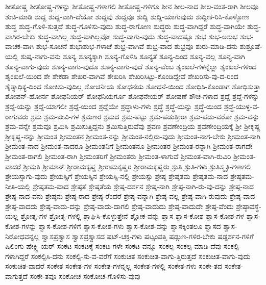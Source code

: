 {ಶೀತೋಷ್ಣ
ಶೀತೋಷ್ಣ-ಗಳನ್ನು
ಶೀತೋಷ್ಣ-ಗಳಾಗಲಿ
ಶೀತೋಷ್ಣ-ಗಳಿಗೂ
ಶೀನ
ಶೀಲ-ನಾದ
ಶೀಲ-ವಂತ-ರಾಗಿ
ಶೀಲವೂ
ಶುಚಿ-ಮಾಡಿ
ಶುದ್ದ
ಶುದ್ದ-ವಾಗಿ-ದೆಯೋ
ಶುದ್ದವು
ಶುದ್ದವೂ
ಶುದ್ದಿ
ಶುದ್ದಿ-ಯಾಗುವುದು
ಶುದ್ದೀಕ-ರಿಸಿ-ಕೊಳ್ಳೋಣ
ಶುದ್ಧ
ಶುದ್ಧ-ಗೊಳಿ-ಸುತ್ತದೆ
ಶುದ್ಧ-ಗೊಳಿಸು-ವುದು
ಶುದ್ಧ-ರಾಗೋಣ
ಶುದ್ಧರು
ಶುದ್ಧ-ವಾಗಿದ್ದರೆ
ಶುದ್ಧ-ವಾಗಿಯೇ
ಶುದ್ಧ-ವಾಗಿರ-ಬೇಕು
ಶುದ್ಧ-ವಾಗಿಲ್ಲ
ಶುದ್ಧ-ವಾಗಿಲ್ಲವೋ
ಶುದ್ಧ-ವಾಗು-ವುದು
ಶುದ್ಧ-ವಾದಷ್ಟೂ
ಶುಭ
ಶುಭ-ಅಶುಭ
ಶುಭ-ವಾಚಕ-ವಾಗಿ
ಶುಭ-ಸೂಚನೆ
ಶುಭಾಶುಭ-ಗಳಾಚೆ
ಶುಭ್ರ-ವಾಗಿವೆ
ಶುಭ್ರ-ವಾದ
ಶುಭ್ರವೂ
ಶುರು-ಮಾಡಿ-ದನು
ಶುಶ್ರೂಷೆ-ಯಲ್ಲಿ
ಶುಷ್ಕ-ನಾಗು-ವನು
ಶೂನ್ಯ
ಶೂನ್ಯಕ್ಕಾಗಿ
ಶೂನ್ಯ-ಗೊಳಿಸಿ
ಶೂನ್ಯತೆ
ಶೂನ್ಯ-ದಿಂದ
ಶೂನ್ಯ-ವಲ್ಲ
ಶೂನ್ಯ-ವಾಗಿ
ಶೂನ್ಯ-ವಾಗು-ವುದು
ಶೂನ್ಯ-ವಾಗು-ವುದೂ
ಶೂನ್ಯ-ವಾಗು-ವುದೆ
ಶೂನ್ಯ-ವೆಂಬ
ಶೃಂಖಲೆ-ಗಳನ್ನೆಲ್ಲಾ
ಶೃಂಖಲೆ-ಗಳಿಂದ
ಶೃಂಖಲೆ-ಯಿಂದ
ಶೇ
ಶೇಕಡಾ
ಶೇಖರ-ವಾಗಿವೆ
ಶೇಖರಿಸಿ
ಶೇಖರಿಸಿಟ್ಟು-ಕೊಂಡಿದ್ದೇವೆ
ಶೇಖರಿಸು-ವು-ದ-ರಿಂದ
ಶೈತ್ಯಾಧಿಕ್ಯ-ದಿಂದ
ಶೋಕಿಸು-ವುದಿಲ್ಲ
ಶೋಚನೀಯ
ಶೋಧನೆಯ
ಶೋಧನೆ-ಯಿಂದ
ಶೋಧಿಸಿ-ಕೊಂಡಾಗ
ಶೋಧಿಸುತ್ತಾ
ಶೋಪನ್-ಹೋರ್ನ
ಶೋಫನಿಯರ್
ಶೋಫನಿಯರ್ಗೂ
ಶೋಫನೇಯರ್
ಶೋಷಣೆ
ಶೌಚ-ಗಳಾದ
ಶ್ರದ್ದೆ
ಶ್ರದ್ದೆ-ಗಳನ್ನು
ಶ್ರದ್ದೆ-ಯನ್ನು
ಶ್ರದ್ದೆ-ಯಾಗಲೀ
ಶ್ರದ್ದೆ-ಯಿಂದ
ಶ್ರದ್ದೆಯೇ
ಶ್ರದ್ಧಾಳು-ಗಳು
ಶ್ರದ್ಧೆ
ಶ್ರದ್ಧೆ-ಯನ್ನು
ಶ್ರದ್ಧೆ-ಯಿಂದ
ಶ್ರದ್ಧೆ-ಯುಳ್ಳ-ವ-ರಾಗುವರು
ಶ್ರಮ
ಶ್ರಮ-ಜೀವಿ-ಗಳ
ಶ್ರಮಣರ
ಶ್ರಮದ
ಶ್ರಮ-ಪಟ್ಟು
ಶ್ರಮ-ಪಡುತ್ತೀರಾ
ಶ್ರಮ-ಪಡು-ವರೋ
ಶ್ರಮ-ವನ್ನು
ಶ್ರಮ-ವನ್ನೇ
ಶ್ರಮವೂ
ಶ್ರಮಿಸಿ
ಶ್ರಮಿಸುತ್ತಿದ್ದನು
ಶ್ರಮಿಸುತ್ತಿರುವೆವು
ಶ್ರವಣ
ಶ್ರವಣೇಂದ್ರಿಯ
ಶ್ರವಣೇಂದ್ರಿಯಕ್ಕೆ
ಶ್ರೀ
ಶ್ರೀಕೃಷ್ಣ
ಶ್ರೀಕೃಷ್ಣ-ನನ್ನು
ಶ್ರೀಮಂತ
ಶ್ರೀಮಂತನ
ಶ್ರೀಮಂತ-ನನ್ನು
ಶ್ರೀಮಂತ-ನಲ್ಲಿರು-ವುದು
ಶ್ರೀಮಂತ-ನಾಗ-ಬೇಕು
ಶ್ರೀಮಂತ-ನಾಗಿ
ಶ್ರೀಮಂತ-ನಾದ
ಶ್ರೀಮಂತ-ನಾದರೂ
ಶ್ರೀಮಂತನಿಗೆ
ಶ್ರೀಮಂತನೂ
ಶ್ರೀಮಂತರ
ಶ್ರೀಮಂತ-ರನ್ನಾಗಿ
ಶ್ರೀಮಂತ-ರಾಗದೇ
ಶ್ರೀಮಂತ-ರಾಗಲಿ
ಶ್ರೀಮಂತ-ರಾಗಿ
ಶ್ರೀಮಂತರಿಗೆ
ಶ್ರೀಮಂತರು
ಶ್ರೀಮಂತ-ಳಾಗುವೆ
ಶ್ರೀಮಂತ-ವಾಗಿ-ರುವಿರಿ
ಶ್ರೀಮಂತ-ವಾದರೆ
ಶ್ರೀಮತಿ
ಶ್ರೀಮಾನ್
ಶ್ರೀರಾಮಕೃಷ್ಣ
ಶ್ರೀರಾಮಕೃಷ್ಣರ
ಶ್ರೀರಾಮಕೃಷ್ಣರು
ಶ್ರುತಿ
ಶ್ರುತಿ-ಗಳು
ಶ್ರುತಿಸ್ಮೃತಿ-ಗಳಾಗಲಿ
ಶ್ರೇಯಸ್ಸಾಗು-ವುದು
ಶ್ರೇಯಸ್ಸಿಗೆ
ಶ್ರೇಯಸ್ಸಿನ
ಶ್ರೇಯಸ್ಸಿ-ನಲ್ಲಿ
ಶ್ರೇಯಸ್ಸು
ಶ್ರೇಷ್ಠ
ಶ್ರೇಷ್ಠತಮ
ಶ್ರೇಷ್ಠತಮ-ನಾದ
ಶ್ರೇಷ್ಠತಮ-ನೀತಿ-ಯಲ್ಲಿ
ಶ್ರೇಷ್ಠತಮ-ವಾದ
ಶ್ರೇಷ್ಠತೆ
ಶ್ರೇಷ್ಠತೆಯ
ಶ್ರೇಷ್ಠ-ದರ್ಶನ
ಶ್ರೇಷ್ಠ-ನಾಗಿ
ಶ್ರೇಷ್ಠ-ನಾಗಿ-ರು-ವು-ದನ್ನು
ಶ್ರೇಷ್ಠ-ನಾದ
ಶ್ರೇಷ್ಠ-ನಾದ-ವನು
ಶ್ರೇಷ್ಠನು
ಶ್ರೇಷ್ಠ-ರಾದ
ಶ್ರೇಷ್ಠ-ರೆಂದರೆ
ಶ್ರೇಷ್ಠ-ವನ್ನಾಗಿ
ಶ್ರೇಷ್ಠ-ವಲ್ಲ
ಶ್ರೇಷ್ಠ-ವಾಗಿ-ರುವುದು
ಶ್ರೇಷ್ಠ-ವಾದ
ಶ್ರೇಷ್ಠ-ವಾದದು
ಶ್ರೇಷ್ಠ-ವಾದು-ದನ್ನು
ಶ್ರೇಷ್ಠ-ವಾದು-ದಾಗಲಿ
ಶ್ರೇಷ್ಠ-ವಾದುದು
ಶ್ರೇಷ್ಠ-ವಾದುದೇ
ಶ್ರೇಷ್ಠ-ವೆಂದು
ಶ್ರೇಷ್ಠಾವಸ್ಥೆ-ಯಲ್ಲ
ಶ್ರೋತೃ-ಗಳ
ಶ್ರೋತೃ-ಗಳಲ್ಲಿ
ಶ್ಲಾಘಿಸಿ-ಕೊಳ್ಳುತ್ತೇನೆ
ಶ್ಲೋಕ-ವನ್ನು
ಶ್ವಾಸ
ಶ್ವಾಸ-ಕೋಶ
ಶ್ವಾಸ-ಕೋಶ-ಗಳ
ಶ್ವಾಸ-ಕೋಶ-ಗಳನ್ನು
ಶ್ವಾಸ-ಕೋಶ-ಗಳಿಗೆ
ಶ್ವಾಸ-ಕೋಶ-ಗಳು
ಶ್ವಾಸ-ಕೋಶ-ವನ್ನು
ಶ್ವಾಸಕ್ಕಿಂತಲೂ
ಶ್ವಾಸದ
ಶ್ವಾಸ-ನಿರೋಧವನ್ನಲ್ಲ
ಶ್ವಾಸಪ್ರಶ್ವಾಸ
ಶ್ವಾಸಪ್ರಶ್ವಾಸದ
ಷಟ್-ಚಕ್ರ-ಗಳು
ಷಟ್ಸಂಪತ್ತಿ
ಷಡ್ಗುಣ-ಗಳಿರ-ಬೇಕು
ಷಡ್ದರ್ಶನ-ಗಳಿಗೆ
ಷಿಲಿಂಗು
ಷೇಕ್ಸ್ಪಿ-ಯರ್
ಸಂಕಟ
ಸಂಕಟಕ್ಕೆ
ಸಂಕಟ-ಗಳೇ
ಸಂಕಟ-ವನ್ನೂ
ಸಂಕಲ್ಪ
ಸಂಕಲ್ಪ-ಮಾಡಿ-ದೆವು
ಸಂಕಲ್ಪಿ-ಗಳಾಗಿದ್ದರೆ
ಸಂಕಲ್ಪಿಸಿ-ದನು
ಸಂಕಲ್ಪಿ-ಸು-ವ-ವರೆಗೆ
ಸಂಕುಚಿತ
ಸಂಕುಚಿತ-ವಾಗು-ತ್ತಿರುತ್ತದೆ
ಸಂಕುಚಿತ-ವಾಗು-ವುದು
ಸಂಕುಚಿತ-ವಾದರೆ
ಸಂಕೇತ
ಸಂಕೇತ-ಗಳ
ಸಂಕೇತ-ಗಳನ್ನಲ್ಲ
ಸಂಕೇತ-ಗಳಲ್ಲಿ
ಸಂಕೇತ-ಗಳು
ಸಂಕೇ-ತದ
ಸಂಕೇತ-ವಾಗುತ್ತದೆ
ಸಂಕೇ-ತವೂ
ಸಂಕೋಚ
ಸಂಕೋಚ-ಗೊಳಿಸು-ವುವು
}
